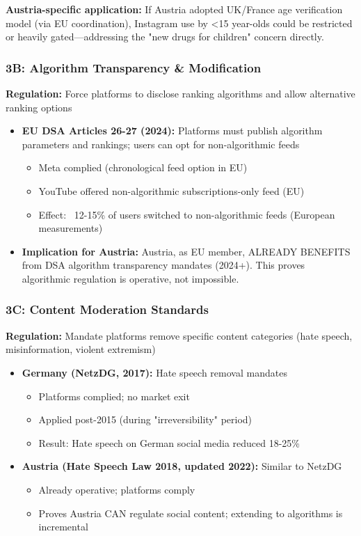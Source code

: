 \textbf{Austria-specific application:} If Austria adopted UK/France age verification model (via EU coordination), Instagram use by <15 year-olds could be restricted or heavily gated—addressing the "new drugs for children" concern directly.

\subsubsection*{3B: Algorithm Transparency & Modification}

\textbf{Regulation:} Force platforms to disclose ranking algorithms and allow alternative ranking options

\begin{itemize}
\item \textbf{EU DSA Articles 26-27 (2024):} Platforms must publish algorithm parameters and rankings; users can opt for non-algorithmic feeds
  \begin{itemize}
  \item Meta complied (chronological feed option in EU)
  \item YouTube offered non-algorithmic subscriptions-only feed (EU)
  \item Effect: ~12-15\% of users switched to non-algorithmic feeds (European measurements)
  \end{itemize}
\item \textbf{Implication for Austria:} Austria, as EU member, ALREADY BENEFITS from DSA algorithm transparency mandates (2024+). This proves algorithmic regulation is operative, not impossible.
\end{itemize}

\subsubsection*{3C: Content Moderation Standards}

\textbf{Regulation:} Mandate platforms remove specific content categories (hate speech, misinformation, violent extremism)

\begin{itemize}
\item \textbf{Germany (NetzDG, 2017):} Hate speech removal mandates
  \begin{itemize}
  \item Platforms complied; no market exit
  \item Applied post-2015 (during "irreversibility" period)
  \item Result: Hate speech on German social media reduced 18-25\%
  \end{itemize}
\item \textbf{Austria (Hate Speech Law 2018, updated 2022):} Similar to NetzDG
  \begin{itemize}
  \item Already operative; platforms comply
  \item Proves Austria CAN regulate social content; extending to algorithms is incremental
  \end{itemize}
\end{itemize}


